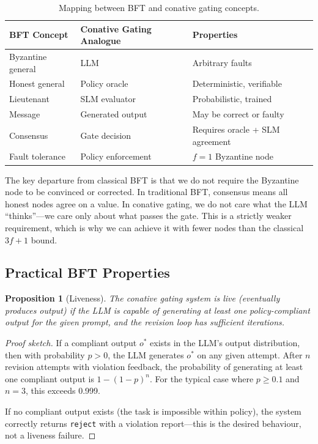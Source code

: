 \documentclass[11pt,a4paper]{article}
\newtheorem{proposition}[theorem]{Proposition}
\begin{document}
\begin{table}[t]
\centering
\caption{Mapping between BFT and conative gating concepts.}
\label{tab:bft-mapping}
\begin{tabular}{@{}lll@{}}
\toprule
\textbf{BFT Concept} & \textbf{Conative Gating Analogue} & \textbf{Properties} \\
\midrule
Byzantine general & LLM & Arbitrary faults \\
Honest general & Policy oracle & Deterministic, verifiable \\
Lieutenant & SLM evaluator & Probabilistic, trained \\
Message & Generated output & May be correct or faulty \\
Consensus & Gate decision & Requires oracle + SLM agreement \\
Fault tolerance & Policy enforcement & $f = 1$ Byzantine node \\
\bottomrule
\end{tabular}
\end{table}

The key departure from classical BFT is that we do not require the
Byzantine node to be convinced or corrected.  In traditional BFT,
consensus means all honest nodes agree on a value.  In conative
gating, we do not care what the LLM ``thinks''---we care only about
what passes the gate.  This is a strictly weaker requirement, which
is why we can achieve it with fewer nodes than the classical
$3f + 1$ bound.

\subsection{Practical BFT Properties}

\begin{proposition}[Liveness]
\label{prop:liveness}
The conative gating system is live (eventually produces output) if
the LLM is capable of generating at least one policy-compliant
output for the given prompt, and the revision loop has sufficient
iterations.
\end{proposition}

\begin{proof}[Proof sketch]
If a compliant output $o^*$ exists in the LLM's output distribution,
then with probability $p > 0$, the LLM generates $o^*$ on any
given attempt.  After $n$ revision attempts with violation feedback,
the probability of generating at least one compliant output is
$1 - (1-p)^n$.  For the typical case where $p \geq 0.1$ and
$n = 3$, this exceeds 0.999.

If no compliant output exists (the task is impossible within policy),
the system correctly returns \texttt{reject} with a violation
report---this is the desired behaviour, not a liveness failure.
\end{proof}
\end{document}
